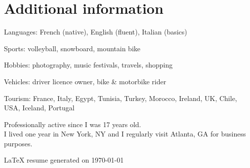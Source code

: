 \documentclass[letterpaper]{article}
\renewenvironment{itemize}{
    \begin{list}{}{
        \setlength{\leftmargin}{1.5em}
    }
}{
    \end{list}
}
\begin{document}
        \vspace{0.6cm}

    \section*{\faPaperPlaneO{} Additional information}

        \begin{itemize}
            \item Languages: French (native), English (fluent), Italian (basics)
            \item Sports: volleyball, snowboard, mountain bike
            \item Hobbies: photography, music festivals, travels, shopping
            \item Vehicles: driver licence owner, bike \& motorbike rider
            \item Tourism: France, Italy, Egypt, Tunisia, Turkey, Morocco, Ireland, UK, Chile, USA, Iceland, Portugal
        \end{itemize}

        \vspace{1cm}
        Professionally active since I was 17 years old.\\
        I lived one year in New York, NY and I regularly visit Atlanta, GA for business purposes.

        \vfill

        \begin{center}
            \begin{footnotesize}
                \LaTeX{} resume generated on \today
            \end{footnotesize}
        \end{center}
\end{document}
